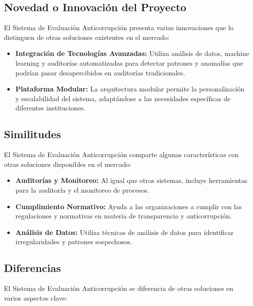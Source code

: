 \documentclass[a4paper,12pt]{article}
\begin{document}
\subsection{Novedad o Innovación del Proyecto}
El Sistema de Evaluación Anticorrupción presenta varias innovaciones que lo distinguen de otras soluciones existentes en el mercado:

\begin{itemize}
    \item \textbf{Integración de Tecnologías Avanzadas:} Utiliza análisis de datos, machine learning y auditorías automatizadas para detectar patrones y anomalías que podrían pasar desapercibidos en auditorías tradicionales.
    \item \textbf{Plataforma Modular:} La arquitectura modular permite la personalización y escalabilidad del sistema, adaptándose a las necesidades específicas de diferentes instituciones.
\end{itemize}

\subsection{Similitudes}
El Sistema de Evaluación Anticorrupción comparte algunas características con otras soluciones disponibles en el mercado:

\begin{itemize}
    \item \textbf{Auditorías y Monitoreo:} Al igual que otros sistemas, incluye herramientas para la auditoría y el monitoreo de procesos.
    \item \textbf{Cumplimiento Normativo:} Ayuda a las organizaciones a cumplir con las regulaciones y normativas en materia de transparencia y anticorrupción.
    \item \textbf{Análisis de Datos:} Utiliza técnicas de análisis de datos para identificar irregularidades y patrones sospechosos.
\end{itemize}

\subsection{Diferencias}
El Sistema de Evaluación Anticorrupción se diferencia de otras soluciones en varios aspectos clave:
\end{document}
